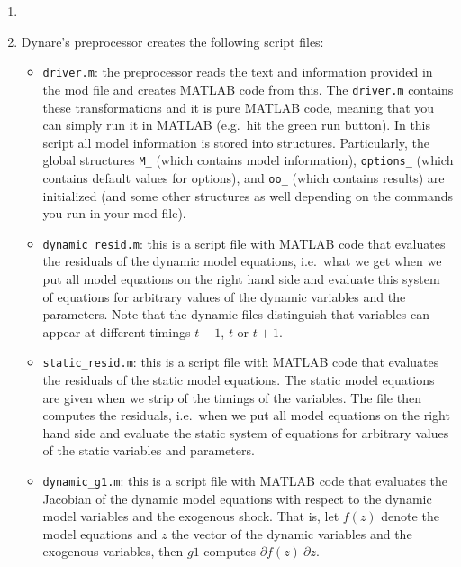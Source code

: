 \begin{enumerate}

\item


\item
Dynare's preprocessor creates the following script files:
\begin{itemize}
  \item
  \texttt{driver.m}: the preprocessor reads the text and information provided in the mod file and creates MATLAB code from this.
  The \texttt{driver.m} contains these transformations and it is pure MATLAB code,
    meaning that you can simply run it in MATLAB (e.g.\ hit the green run button).
  In this script all model information is stored into structures.
  Particularly, the global structures \texttt{M\_} (which contains model information),
    \texttt{options\_} (which contains default values for options),
	and \texttt{oo\_} (which contains results) are initialized
	(and some other structures as well depending on the commands you run in your mod file).

  \item
  \texttt{dynamic\_resid.m}: this is a script file with MATLAB code that evaluates the residuals of the dynamic model equations,
	i.e.\ what we get when we put all model equations on the right hand side
	and evaluate this system of equations for arbitrary values of the dynamic variables and the parameters.
  Note that the dynamic files distinguish that variables can appear at different timings \(t-1\), \(t\) or \(t+1\).

  \item
  \texttt{static\_resid.m}: this is a script file with MATLAB code that evaluates the residuals of the static model equations.
  The static model equations are given when we strip of the timings of the variables.
  The file then computes the residuals, i.e.\ when we put all model equations on the right hand side
	and evaluate the static system of equations for arbitrary values of the static variables and parameters.

  \item
  \texttt{dynamic\_g1.m}: this is a script file with MATLAB code that evaluates the Jacobian of the dynamic model equations
	with respect to the dynamic model variables and the exogenous shock.
  That is, let \(f(z)\) denote the model equations and \(z\) the vector of the dynamic variables and the exogenous variables,
	then \(g1\) computes \(\partial f(z) \ \partial z\).


\end{itemize}
\end{enumerate}
